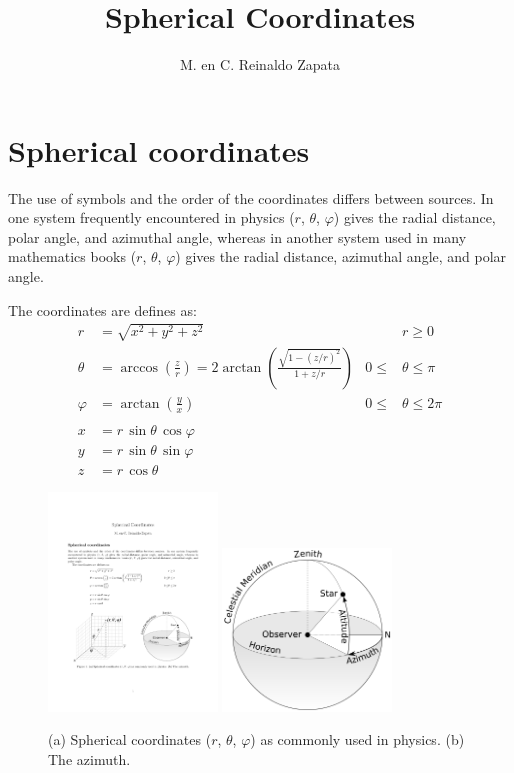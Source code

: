 \documentclass{article}
\title{Spherical Coordinates}
\author{M. en C. Reinaldo Zapata}
\date{}
\begin{document}
\maketitle

\section*{Spherical coordinates} %
\label{sec:spherical_coordinates}

The use of symbols and the order of the coordinates differs between sources. In
one system frequently encountered in physics ($r$, $\theta$, $\varphi$) gives
the radial distance, polar angle, and azimuthal angle, whereas in another system
used in many mathematics books ($r$, $\theta$, $\varphi$) gives the radial
distance, azimuthal angle, and polar angle.

The coordinates are defines as:
\begin{align*}
r &= \sqrt{x^{2} + y^{2} + z^{2}} & & r \geq 0\\
\theta &= \arccos \left( \frac{z}{r} \right) = 2 \arctan \left( \frac{\sqrt{1- 
(z/r)^{2} }}{1 + z/r} \right) & 0 \leq &\theta \leq \pi \\
\varphi &= \arctan \left( \frac{y}{x} \right) & 0 \leq &\theta \leq 2\pi \\ \\ 
x &= r \, \sin \theta \, \cos \varphi \\
y &= r \, \sin \theta \, \sin \varphi \\
z &= r \, \cos \theta
\end{align*}


\begin{figure}[h]
    \centering
    \includegraphics[width=0.4\textwidth]{spherical_coordinates}
    \hspace{0.1\textwidth}
    \includegraphics[width=0.4\textwidth]{azimuth}
    \caption{(a) Spherical coordinates ($r$, $\theta$, $\varphi$) as commonly used
    in physics. (b) The azimuth.}
    \label{fig:spherical coordinates}
\end{figure}



\end{document}
